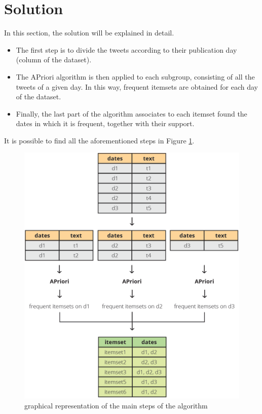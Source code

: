 
\section{Solution}\label{sect_solution}

In this section, the solution will be explained in detail.

\begin{itemize}
  \item The first step is to divide the tweets according to their publication day (column  of the dataset).

  \item The APriori algorithm is then applied to each subgroup, consisting of all the tweets of a given day. In this way, frequent itemsets are obtained for each day of the dataset.
  
  \item Finally, the last part of the algorithm associates to each itemset found the dates in which it is frequent, together with their support.
\end{itemize}

It is possible to find all the aforementioned steps in Figure \ref{figSol}.

\begin{figure}[h]
  \includegraphics[scale=0.292]{solution.png}
  \centering
  \caption{graphical representation of the main steps of the algorithm}
  \label{figSol}
\end{figure} 


